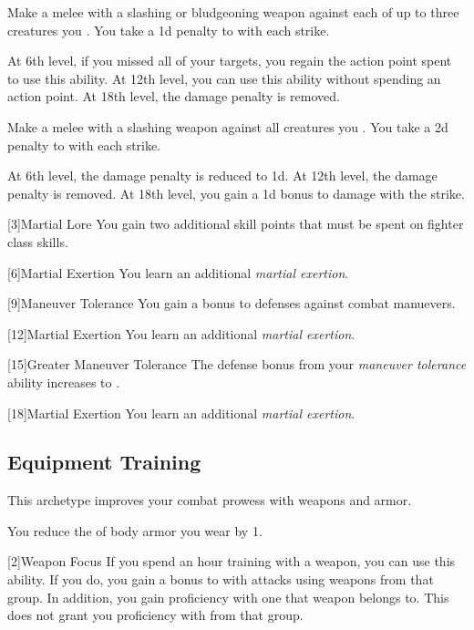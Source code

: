 {             Make a melee  with a slashing or bludgeoning weapon against each of up to three creatures you .
            You take a \minus1d penalty to  with each strike.
            \par At 6th level, if you missed all of your targets, you regain the action point spent to use this ability.
            At 12th level, you can use this ability without spending an action point.
            At 18th level, the damage penalty is removed.

             Make a melee  with a slashing weapon against all creatures you .
            You take a \minus2d penalty to  with each strike.
            \par At 6th level, the damage penalty is reduced to \minus1d.
            At 12th level, the damage penalty is removed.
            At 18th level, you gain a \plus1d bonus to damage with the strike.
        }

        [3]{Martial Lore} You gain two additional skill points that must be spent on fighter class skills.

        [6]{Martial Exertion}
        You learn an additional \textit{martial exertion}.

        [9]{Maneuver Tolerance} You gain a  bonus to defenses against combat manuevers.

        [12]{Martial Exertion} 
        You learn an additional \textit{martial exertion}.

        [15]{Greater Maneuver Tolerance} The defense bonus from your \textit{maneuver tolerance} ability increases to .

        [18]{Martial Exertion}
        You learn an additional \textit{martial exertion}.

    \subsection{Equipment Training}
        This archetype improves your combat prowess with weapons and armor.

        You reduce the  of body armor you wear by 1.

        [2]{Weapon Focus}
        If you spend an hour training with a weapon, you can use this ability.
        If you do, you gain a  bonus to  with attacks using weapons from that group.
        In addition, you gain proficiency with one  that weapon belongs to.
        This does not grant you proficiency with  from that group.

